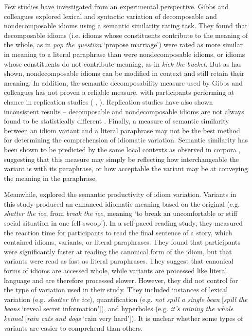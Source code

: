 \documentclass[output=paper,modfonts,nonflat]{langsci/langscibook}
\begin{document}
Few studies have investigated  from an experimental perspective. Gibbs and colleagues \citep{GibbsEtAl1989, GibbsNayak1989} explored lexical and syntactic variation of decomposable and nondecomposable idioms using a semantic similarity rating task. They found that decomposable idioms (i.e. idioms whose constituents contribute to the meaning of the whole, as in \textit{pop the question} `propose marriage') were rated as more similar in meaning to a literal paraphrase than were nondecomposable idioms, or idioms whose constituents do not contribute meaning, as in \textit{kick the bucket}. But as \citet{Duffley2013} has shown, nondecomposable idioms can be modified in context and still retain their meaning. In addition, the semantic decomposability measure used by Gibbs and colleagues has not proven a reliable measure, with participants performing at chance in replication studies (\citeauthor{TitoneConnine1994} \citeyear*{TitoneConnine1994}, \citeauthor*{TabossiEtAl2008} \citeyear*{TabossiEtAl2008}). Replication studies have also shown inconsistent results -- decomposable and nondecomposable idioms are not always found to be statistically different \citep{TabossiEtAl2008}. Finally, a measure of semantic similarity between an idiom variant and a literal paraphrase may not be the best method for determining the comprehension of idiomatic variation. Semantic similarity has been shown to be predicted by the same local contexts as observed in corpora \citep{MillerCharles1991}, suggesting that this measure may simply be reflecting how interchangeable the variant is with its paraphrase, or how acceptable the variant may be at conveying the meaning in the paraphrase.

Meanwhile, \citet{McGloneEtAl1994} explored the semantic productivity of idiom variation. Variants in this study produced an enhanced idiomatic meaning based on the original (e.g. \textit{shatter the ice}, from \textit{break the ice}, meaning `to break an uncomfortable or stiff social situation in one fell swoop'). In a self-paced reading study, they measured the reaction time for participants to read the final sentence of a story, which contained idioms, variants, or literal paraphrases. They found that participants were significantly faster at reading the canonical form of the idiom, but that variants were read as fast as literal paraphrases. They suggest that canonical forms of idioms are accessed whole, while variants are processed like literal language and are therefore processed slower. However, they did not control for the type of variation used in their study. They included instances of lexical variation (e.g. \textit{shatter the ice}), quantification (e.g. \textit{not spill a single bean} [\textit{spill the beans} `reveal secret information']), and hyperboles (e.g. \textit{it's raining the whole kennel} [\textit{rain cats and dogs} `rain very hard']). It is unclear whether some types of variants are easier to comprehend than others. 
\end{document}
